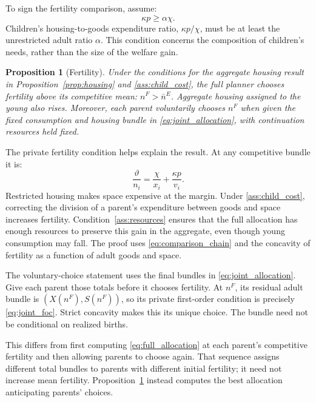 \documentclass[11pt]{article}
\newtheorem{proposition}{Proposition}
\begin{document}
To sign the fertility comparison, assume:
\begin{equation}
\boxed{\kappa p\ge\alpha\chi.}
\tag{A4}\label{ass:child_cost}
\end{equation}
Children's housing-to-goods expenditure ratio, $\kappa p/\chi$, must be at
least the unrestricted adult ratio $\alpha$. This condition concerns the
composition of children's needs, rather than the size of the welfare gain.

\begin{proposition}[Fertility]\label{prop:fertility}
Under the conditions for the aggregate housing result in
Proposition~\ref{prop:housing} and \eqref{ass:child_cost}, the full planner
chooses fertility above its competitive mean: $n^F>\bar n^E$. Aggregate
housing assigned to the young also rises. Moreover, each parent voluntarily
chooses $n^F$ when given the fixed consumption and housing bundle in
\eqref{eq:joint_allocation}, with continuation resources held fixed.
\end{proposition}

The private fertility condition helps explain the result. At any competitive
bundle it is:
\begin{equation}
\frac{\vartheta}{n_i}
 =\frac{\chi}{x_i}+\frac{\kappa p}{v_i}.
\label{eq:private_foc}
\end{equation}
Restricted housing makes space expensive at the margin. Under
\eqref{ass:child_cost}, correcting the division of a parent's expenditure
between goods and space increases fertility. Condition~\eqref{ass:resources}
ensures that the full allocation has enough resources to preserve this gain
in the aggregate, even though young consumption may fall. The proof uses
\eqref{eq:comparison_chain} and the concavity of fertility as a function of
adult goods and space.

The voluntary-choice statement uses the final bundles in
\eqref{eq:joint_allocation}. Give each parent those totals before it chooses
fertility. At $n^F$, its residual adult bundle is $(X(n^F),S(n^F))$, so its
private first-order condition is precisely \eqref{eq:joint_foc}. Strict
concavity makes this its unique choice. The bundle need not be conditional
on realized births.

This differs from first computing \eqref{eq:full_allocation} at each parent's
competitive fertility and then allowing parents to choose again. That
sequence assigns different total bundles to parents with different initial
fertility; it need not increase mean fertility. Proposition~\ref{prop:fertility}
instead computes the best allocation anticipating parents' choices.
\end{document}
